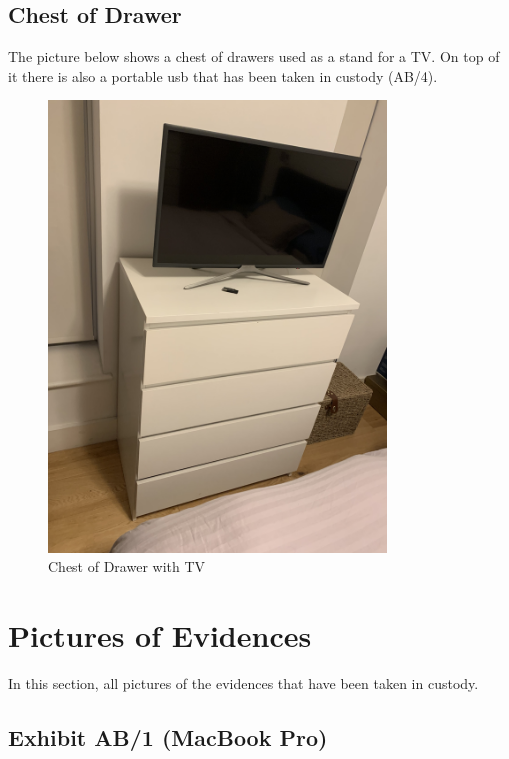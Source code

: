 \subsection{Chest of Drawer}
\label{s:drawer}
The picture below shows a chest of drawers used as a stand for a TV\@. On top of
it there is also a portable usb that has been taken in custody (AB/4).
\begin{figure}[h]
  \centering
  \includegraphics[width=0.8\textwidth, angle=-90,origin=c]{figures/pictures/IMG_5039.JPG}
  \caption{Chest of Drawer with TV}
  \label{fig:drawer}
\end{figure}
\newpage
\section{Pictures of Evidences}
\label{s:evidence-pictures}
In this section, all pictures of the evidences that have been taken in custody.

\subsection{Exhibit AB/1 (MacBook Pro)}
\label{s:ab1}

